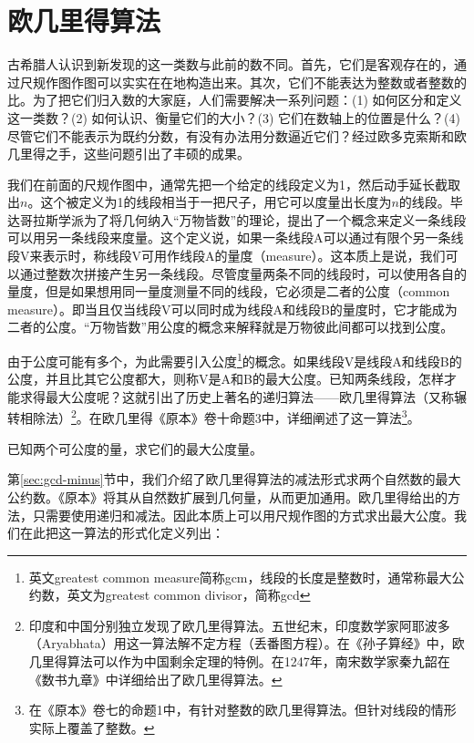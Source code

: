 \documentclass[b5paper]{ctexart}
\begin{document}
\section{欧几里得算法}
\label{sec:Euclidean-algorithm}

古希腊人认识到新发现的这一类数与此前的数不同。首先，它们是客观存在的，通过尺规作图作图可以实实在在地构造出来。其次，它们不能表达为整数或者整数的比。为了把它们归入数的大家庭，人们需要解决一系列问题：(1) 如何区分和定义这一类数？(2) 如何认识、衡量它们的大小？(3) 它们在数轴上的位置是什么？(4) 尽管它们不能表示为既约分数，有没有办法用分数逼近它们？经过欧多克索斯和欧几里得之手，这些问题引出了丰硕的成果。

我们在前面的尺规作图中，通常先把一个给定的线段定义为1，然后动手延长截取出$n$。这个被定义为1的线段相当于一把尺子，用它可以度量出长度为$n$的线段。毕达哥拉斯学派为了将几何纳入“万物皆数”的理论，提出了一个概念来定义一条线段可以用另一条线段来度量。这个定义说，如果一条线段A可以通过有限个另一条线段V来表示时，称线段V可用作线段A的量度（measure）。这本质上是说，我们可以通过整数次拼接产生另一条线段。尽管度量两条不同的线段时，可以使用各自的量度，但是如果想用同一量度测量不同的线段，它必须是二者的公度（common measure）。即当且仅当线段V可以同时成为线段A和线段B的量度时，它才能成为二者的公度。“万物皆数”用公度的概念来解释就是万物彼此间都可以找到公度。

由于公度可能有多个，为此需要引入公度\footnote{英文greatest common measure简称gcm，线段的长度是整数时，通常称最大公约数，英文为greatest common divisor，简称gcd}的概念。如果线段V是线段A和线段B的公度，并且比其它公度都大，则称V是A和B的最大公度。已知两条线段，怎样才能求得最大公度呢？这就引出了历史上著名的递归算法——欧几里得算法（又称辗转相除法）\footnote{印度和中国分别独立发现了欧几里得算法。五世纪末，印度数学家阿耶波多（Aryabhata）用这一算法解不定方程（丢番图方程）。在《孙子算经》中，欧几里得算法可以作为中国剩余定理的特例。在1247年，南宋数学家秦九韶在《数书九章》中详细给出了欧几里得算法。}。在欧几里得《原本》卷十命题3中\cite{Elements}，详细阐述了这一算法\footnote{在《原本》卷七的命题1中，有针对整数的欧几里得算法。但针对线段的情形实际上覆盖了整数。}。

\begin{proposition}[《原本》，卷十，命题3]
已知两个可公度的量，求它们的最大公度量。
\end{proposition}

第\ref{sec:gcd-minus}节中，我们介绍了欧几里得算法的减法形式求两个自然数的最大公约数。《原本》将其从自然数扩展到几何量，从而更加通用。欧几里得给出的方法，只需要使用递归和减法。因此本质上可以用尺规作图的方式求出最大公度。我们在此把这一算法的形式化定义列出：
\end{document}

